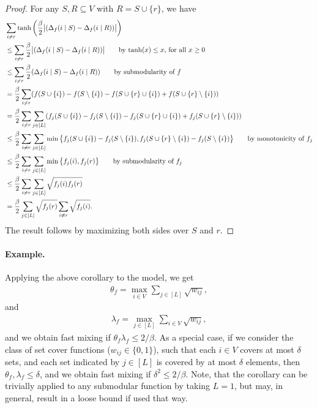 \begin{proof}
  For any $S, R \subseteq V$ with $R = S \cup \{r\}$, we have
  \begin{align*}
  	&\sum_{i \neq r} \tanh \left(\frac{\beta}{2}\big|(\D_f(i\mid S) - \D_f(i\mid R)) \big|\right)\\
    &\leq \sum_{i \neq r} \frac{\beta}{2}\big|(\D_f(i\mid S) - \D_f(i\mid R)) \big| \tag*{by $\tanh(x) \leq x$, for all $x \geq 0$}\\
    &\leq \sum_{i \neq r} \frac{\beta}{2}(\D_f(i\mid S) - \D_f(i\mid R)) \tag*{by submodularity of $f$}\\
    &= \frac{\beta}{2}\sum_{i \neq r}(f(S \cup \{i\}) - f(S \setminus \{i\}) - f(S \cup \{r\} \cup \{i\}) + f(S \cup \{r\} \setminus \{i\}))\\
    &= \frac{\beta}{2}\sum_{i \neq r}\sum_{j \in [L]}(f_{j}(S \cup \{i\}) - f_{j}(S \setminus \{i\}) - f_{j}(S \cup \{r\} \cup \{i\}) + f_{j}(S \cup \{r\} \setminus \{i\}))\\
    &\leq \frac{\beta}{2}\sum_{i \neq r}\sum_{j \in [L]}\min\big\{f_{j}(S \cup \{i\}) - f_{j}(S \setminus \{i\}), f_{j}(S \cup \{r\} \setminus \{i\}) - f_{j}(S \setminus \{i\})\big\} \tag*{by monotonicity of $f_{j}$}\\
    &\leq \frac{\beta}{2}\sum_{i \neq r}\sum_{j \in [L]}\min\big\{f_{j}(i), f_{j}(r)\big\} \tag*{by submodularity of $f_{j}$}\\
    &\leq \frac{\beta}{2}\sum_{i \neq r}\sum_{j \in [L]}\sqrt{f_{j}(i) f_{j}(r)}\\
    &= \frac{\beta}{2}\sum_{j \in [L]}\sqrt{f_{j}(r)}\sum_{i \neq r}\sqrt{ f_{j}(i)}.
  \end{align*}
  The result follows by maximizing both sides over $S$ and $r$.
\end{proof}

\paragraph{Example.}Applying the above corollary to the \flid{} model, we get
\begin{align*}
\theta_f = \max_{i \in V} \sum_{j \in [L]} \sqrt{w_{ij}},
\end{align*}
and
\begin{align*}
\lambda_f = \max_{j \in [L]} \sum_{i \in V} \sqrt{w_{ij}},
\end{align*}
and we obtain fast mixing if $\theta_f \lambda_f \leq 2/\beta$.
As a special case, if we consider the class of set cover functions ($w_{ij} \in \{0, 1\}$), such that each $i \in V$ covers at most $\delta$ sets, and each set indicated by $j \in [L]$ is covered by at most $\delta$ elements, then $\theta_f, \lambda_f \leq \delta$, and we obtain fast mixing if $\delta^2 \leq 2/\beta$.
Note, that the corollary can be trivially applied to any submodular function by taking $L=1$, but may, in general, result in a loose bound if used that way.

